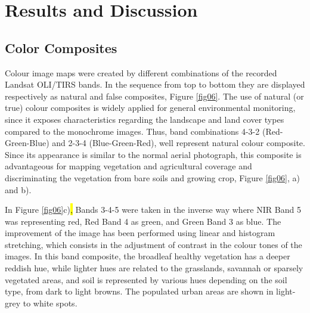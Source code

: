 \documentclass[jimaging,article,submit,pdftex,moreauthors]{Definitions/mdpi}
\begin{document}
\section{Results and Discussion}
\subsection{Color Composites}
Colour image maps were created by different combinations of the recorded Landsat OLI/TIRS bands. In the sequence from top to bottom they are displayed respectively as natural and false composites,\hl{ }Figure \ref{fig06}. The use of natural (or true) colour composites is widely applied for general environmental monitoring, since it exposes\hl{ }characteristics regarding the landscape and land cover types compared to the monochrome images.\hl{ }Thus, band combinations 4-3-2 (Red-Green-Blue) and 2-3-4 (Blue-Green-Red), well represent natural colour composite. Since its appearance is similar to the normal aerial photograph, this composite is advantageous for mapping vegetation and agricultural coverage and discriminating the vegetation from bare soils and growing crop, Figure \ref{fig06}, a) and b). 

In Figure \ref{fig06}c)\hl{, }Bands 3-4-5 were taken in the inverse way where NIR Band 5 was representing red, Red Band 4 as green, and Green Band 3 as blue. The improvement of the image has been performed using linear and histogram stretching, which consists in the adjustment of contrast in the colour tones of the images. In this band composite, the broadleaf healthy vegetation has a deeper reddish hue, while lighter hues are related to the grasslands, savannah\hl{ }or sparsely vegetated areas, and soil is represented by various hues depending on the soil type, from dark to light browns. The populated urban areas are shown in light-grey to white spots. 
\end{document}
